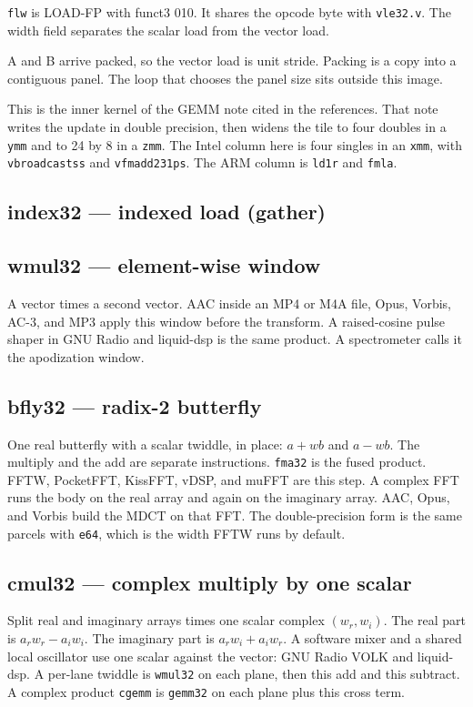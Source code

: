\texttt{flw} is LOAD-FP with funct3 010. It shares the opcode byte with \texttt{vle32.v}. The width field separates the scalar load from the vector load.

A and B arrive packed, so the vector load is unit stride. Packing is a copy into a contiguous panel. The loop that chooses the panel size sits outside this image.

This is the inner kernel of the GEMM note cited in the references. That note writes the update in double precision, then widens the tile to four doubles in a \texttt{ymm} and to 24 by 8 in a \texttt{zmm}. The Intel column here is four singles in an \texttt{xmm}, with \texttt{vbroadcastss} and \texttt{vfmadd231ps}. The ARM column is \texttt{ld1r} and \texttt{fmla}.



\subsection{index32 --- indexed load (gather)}


\subsection{wmul32 --- element-wise window}
A vector times a second vector. AAC inside an MP4 or M4A file, Opus, Vorbis, AC-3, and MP3 apply this window before the transform. A raised-cosine pulse shaper in GNU Radio and liquid-dsp is the same product. A spectrometer calls it the apodization window.



\subsection{bfly32 --- radix-2 butterfly}
One real butterfly with a scalar twiddle, in place: $a + wb$ and $a - wb$. The multiply and the add are separate instructions. \texttt{fma32} is the fused product. FFTW, PocketFFT, KissFFT, vDSP, and muFFT are this step. A complex FFT runs the body on the real array and again on the imaginary array. AAC, Opus, and Vorbis build the MDCT on that FFT. The double-precision form is the same parcels with \texttt{e64}, which is the width FFTW runs by default.



\subsection{cmul32 --- complex multiply by one scalar}
Split real and imaginary arrays times one scalar complex $(w_r, w_i)$. The real part is $a_r w_r - a_i w_i$. The imaginary part is $a_r w_i + a_i w_r$. A software mixer and a shared local oscillator use one scalar against the vector: GNU Radio VOLK and liquid-dsp. A per-lane twiddle is \texttt{wmul32} on each plane, then this add and this subtract. A complex product \texttt{cgemm} is \texttt{gemm32} on each plane plus this cross term.

